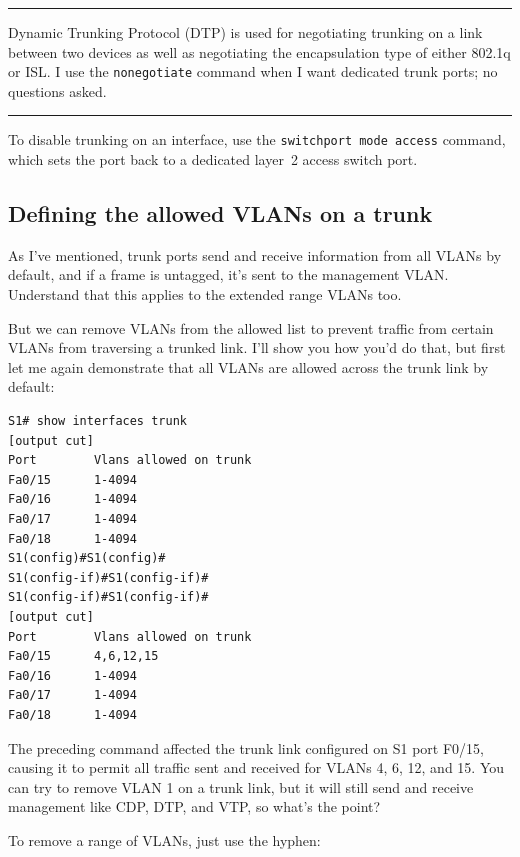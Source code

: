 \begin{center}\rule{0.5\linewidth}{0.5pt}\end{center}

Dynamic Trunking Protocol (DTP) is used
for negotiating trunking on a link between two devices as well as
negotiating the encapsulation type of either 802.1q or ISL. I use the
\texttt{nonegotiate} command when I want dedicated trunk ports; no
questions asked.

\begin{center}\rule{0.5\linewidth}{0.5pt}\end{center}

To disable trunking on an interface, use the \texttt{switchport\ mode\ access} command,
which sets the port back to a dedicated layer~2 access switch port.




\subsection{Defining the allowed VLANs on a trunk}

As I've mentioned, trunk ports send and receive information from all
VLANs by default, and if a frame is untagged, it's sent to the
management VLAN. Understand that this applies to the extended range
VLANs too.

But we can remove VLANs from the allowed list to prevent traffic from
certain VLANs from traversing a trunked link. I'll show you how you'd do
that, but first let me again demonstrate that all VLANs are allowed
across the trunk link by default:

\begin{verbatim}
S1# show interfaces trunk
[output cut]
Port        Vlans allowed on trunk
Fa0/15      1-4094
Fa0/16      1-4094
Fa0/17      1-4094
Fa0/18      1-4094
S1(config)#S1(config)#
S1(config-if)#S1(config-if)#
S1(config-if)#S1(config-if)#
[output cut]
Port        Vlans allowed on trunk
Fa0/15      4,6,12,15
Fa0/16      1-4094
Fa0/17      1-4094
Fa0/18      1-4094
\end{verbatim}

The preceding command affected the trunk link configured on S1 port
F0/15, causing it to permit all traffic sent and received for VLANs 4,
6, 12, and 15. You can try to remove VLAN 1 on a trunk link, but it will
still send and receive management like CDP, DTP, and VTP, so what's the
point?

To remove a range of VLANs, just use the hyphen:

